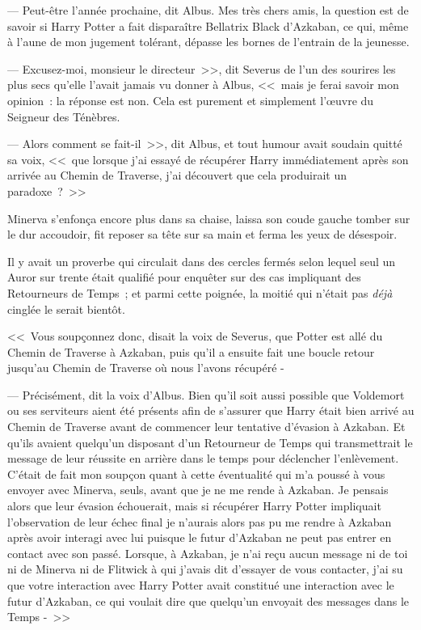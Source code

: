 --- Peut-être l'année prochaine, dit Albus. Mes très chers amis, la question est de savoir si Harry Potter a fait disparaître Bellatrix Black d'Azkaban, ce qui, même à l'aune de mon jugement tolérant, dépasse les bornes de l'entrain de la jeunesse.

--- Excusez-moi, monsieur le directeur~>>, dit Severus de l'un des sourires les plus secs qu'elle l'avait jamais vu donner à Albus, <<~mais je ferai savoir mon opinion~: la réponse est non. Cela est purement et simplement l'œuvre du Seigneur des Ténèbres.

--- Alors comment se fait-il~>>, dit Albus, et tout humour avait soudain quitté sa voix, <<~que lorsque j'ai essayé de récupérer Harry immédiatement après son arrivée au Chemin de Traverse, j'ai découvert que cela produirait un paradoxe~?~>>

Minerva s'enfonça encore plus dans sa chaise, laissa son coude gauche tomber sur le dur accoudoir, fit reposer sa tête sur sa main et ferma les yeux de désespoir.

Il y avait un proverbe qui circulait dans des cercles fermés selon lequel seul un Auror sur trente était qualifié pour enquêter sur des cas impliquant des Retourneurs de Temps~; et parmi cette poignée, la moitié qui n'était pas \emph{déjà} cinglée le serait bientôt.

<<~Vous soupçonnez donc, disait la voix de Severus, que Potter est allé du Chemin de Traverse à Azkaban, puis qu'il a ensuite fait une boucle retour jusqu'au Chemin de Traverse où nous l'avons récupéré -

--- Précisément, dit la voix d'Albus. Bien qu'il soit aussi possible que Voldemort ou ses serviteurs aient été présents afin de s'assurer que Harry était bien arrivé au Chemin de Traverse avant de commencer leur tentative d'évasion à Azkaban. Et qu'ils avaient quelqu'un disposant d'un Retourneur de Temps qui transmettrait le message de leur réussite en arrière dans le temps pour déclencher l'enlèvement. C'était de fait mon soupçon quant à cette éventualité qui m'a poussé à vous envoyer avec Minerva, seuls, avant que je ne me rende à Azkaban. Je pensais alors que leur évasion échouerait, mais si récupérer Harry Potter impliquait l'observation de leur échec final je n'aurais alors pas pu me rendre à Azkaban après avoir interagi avec lui puisque le futur d'Azkaban ne peut pas entrer en contact avec son passé. Lorsque, à Azkaban, je n'ai reçu aucun message ni de toi ni de Minerva ni de Flitwick à qui j'avais dit d'essayer de vous contacter, j'ai su que votre interaction avec Harry Potter avait constitué une interaction avec le futur d'Azkaban, ce qui voulait dire que quelqu'un envoyait des messages dans le Temps -~>>

